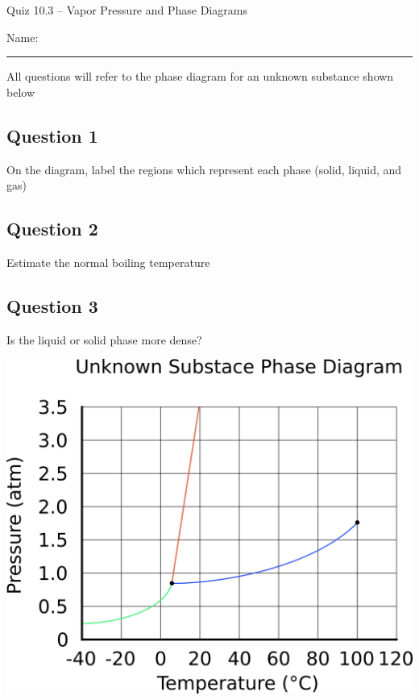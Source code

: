 \documentclass[11pt, letterpaper]{memoir}
\begin{document}
	\begin{center}
		{\large	Quiz 10.3 -- Vapor Pressure and Phase Diagrams}
	\end{center}
	{\large Name: \rule[-1mm]{4in}{.1pt} 
	
	\begin{center}	
	All questions will refer to the phase diagram for an unknown substance shown below
	\end{center}
	
	\noindent
	\begin{minipage}[T]{0.49\textwidth}
		\subsection*{Question 1}
		On the diagram, label the regions which represent each phase (solid, liquid, and gas)
		
		\subsection*{Question 2}
		Estimate the normal boiling temperature
		
		\hspace{1em}
		\subsection*{Question 3}
		Is the liquid or solid phase more dense?
		
	\end{minipage} \hspace{1em}
	\begin{minipage}[T]{0.49\textwidth}
		\includegraphics[width=\textwidth]{Phase_Diagram}
	\end{minipage}

}
\end{document}
